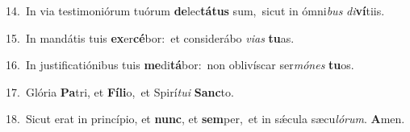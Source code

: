 {\numbfont\textcolor{\numbcolor}{14.}}~In via testimoniórum tuórum \textbf{de}\-lec\-\textbf{tá}\-\textbf{tus} sum,~\star sicut in ómni\textit{bus} \textit{di}\-\textbf{ví}tiis.\par
{\numbfont\textcolor{\numbcolor}{15.}}~In mandátis tuis \textbf{ex}\-er\-\textbf{cé}\-bor:~\star et considerábo \textit{vi}\-\textit{as} \textbf{tu}\-as.\par
{\numbfont\textcolor{\numbcolor}{16.}}~In justificatiónibus tuis \textbf{me}\-di\-\textbf{tá}\-bor:~\star non oblivíscar ser\-\textit{mó}\-\textit{nes} \textbf{tu}\-os.\par
{\numbfont\textcolor{\numbcolor}{17.}}~Glória \textbf{Pa}\-tri, et \textbf{Fí}\-\textbf{li}o,~\star et Spirí\-\textit{tu}\-\textit{i} \textbf{Sanc}\-to.\par
{\numbfont\textcolor{\numbcolor}{18.}}~Sicut erat in princípio, et \textbf{nunc}\-, et \textbf{sem}\-per,~\star et in sǽcula sæcu\-\textit{ló}\-\textit{rum}. \textbf{A}\-men.\par

